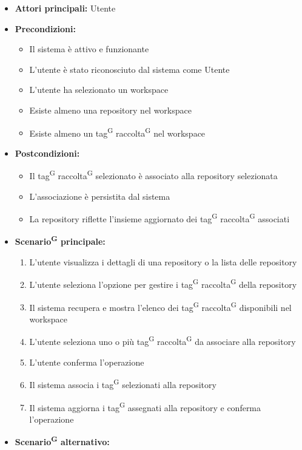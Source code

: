 \documentclass[a4paper, 11pt]{article}
\begin{document}
\begin{itemize}
	\item \textbf{Attori principali:} Utente
	\item \textbf{Precondizioni:}
	\begin{itemize}
		\item Il sistema è attivo e funzionante
		\item L'utente è stato riconosciuto dal sistema come Utente
		\item L'utente ha selezionato un workspace
		\item Esiste almeno una repository nel workspace
		\item Esiste almeno un tag\textsuperscript{G} raccolta\textsuperscript{G} nel workspace
	\end{itemize}
	\item \textbf{Postcondizioni:}
	\begin{itemize}
		\item Il tag\textsuperscript{G} raccolta\textsuperscript{G} selezionato è associato alla repository selezionata
		\item L'associazione è persistita dal sistema
		\item La repository riflette l'insieme aggiornato dei tag\textsuperscript{G} raccolta\textsuperscript{G} associati
	\end{itemize}
	\item \textbf{Scenario\textsuperscript{G} principale:}
	\begin{enumerate}
		\item L'utente visualizza i dettagli di una repository o la lista delle repository
		\item L'utente seleziona l'opzione per gestire i tag\textsuperscript{G} raccolta\textsuperscript{G} della repository
		\item Il sistema recupera e mostra l'elenco dei tag\textsuperscript{G} raccolta\textsuperscript{G} disponibili nel workspace
		\item L'utente seleziona uno o più tag\textsuperscript{G} raccolta\textsuperscript{G} da associare alla repository
		\item L'utente conferma l'operazione
		\item Il sistema associa i tag\textsuperscript{G} selezionati alla repository
		\item Il sistema aggiorna i tag\textsuperscript{G} assegnati alla repository e conferma l'operazione
	\end{enumerate}
		\item \textbf{Scenario\textsuperscript{G} alternativo:}

\end{itemize}
\end{document}
